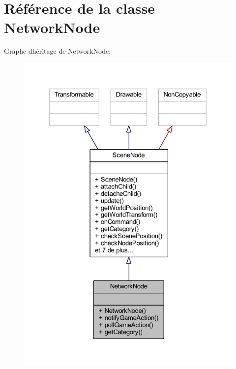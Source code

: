 \hypertarget{class_network_node}{}\section{Référence de la classe Network\+Node}
\label{class_network_node}


Graphe d\textquotesingle{}héritage de Network\+Node\+:\nopagebreak
\begin{figure}[H]
\begin{center}
\leavevmode
\includegraphics[width=324pt]{class_network_node__inherit__graph}
\end{center}
\end{figure}


